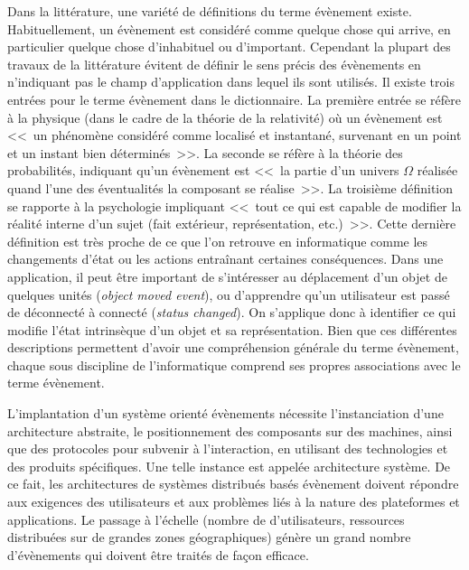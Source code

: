 Dans la littérature, une variété de définitions du terme évènement existe. 
Habituellement, un évènement est considéré comme quelque chose qui 
\og arrive\fg{}, en particulier quelque chose d'inhabituel ou d'important. 
Cependant la plupart des travaux de la littérature évitent de définir le sens précis 
des évènements en n'indiquant pas le champ d'application dans lequel ils sont 
utilisés. 
Il existe trois entrées pour le terme évènement dans le dictionnaire. 
La première entrée se réfère à la physique (dans le cadre de la théorie 
de la relativité) où un évènement est <<~un phénomène considéré comme localisé 
et instantané, survenant en un point et un instant bien déterminés~>>. La seconde 
se réfère à la théorie des probabilités, indiquant qu'un évènement est <<~la partie 
d'un univers $\Omega$ réalisée quand l'une des éventualités la composant se 
réalise~>>. La troisième définition se rapporte à la psychologie impliquant <<~tout 
ce qui est capable de modifier la réalité interne d'un sujet (fait extérieur, 
représentation, etc.)~>>. Cette dernière définition est très proche de ce que l'on 
retrouve en informatique comme les changements d'état ou les actions entraînant 
certaines conséquences. Dans une application, il peut être important de 
s'intéresser au déplacement d'un objet de quelques unités (\textit{object moved 
	event}), ou d'apprendre qu'un utilisateur est passé de déconnecté à connecté 
(\textit{status changed}). On s'applique donc à identifier ce qui modifie l'état 
intrinsèque d'un objet et sa représentation. Bien que ces différentes descriptions 
permettent d'avoir une compréhension générale du terme évènement, chaque sous 
discipline de l'informatique comprend 
ses propres associations avec le terme évènement.

L'implantation d'un système orienté évènements nécessite l'instanciation d'une 
architecture abstraite, 
le positionnement des composants sur des machines, ainsi que des protocoles 
pour subvenir à l'interaction, en utilisant des technologies et des produits 
spécifiques. Une telle instance est appelée architecture système. De ce fait, les 
architectures de systèmes distribués basés évènement doivent 
répondre aux exigences des utilisateurs et aux problèmes liés à la nature des 
plateformes et applications. 
Le passage à l'échelle (nombre de d'utilisateurs, ressources distribuées sur de 
grandes zones géographiques) génère un grand nombre d'évènements qui doivent 
être traités de façon efficace. 

